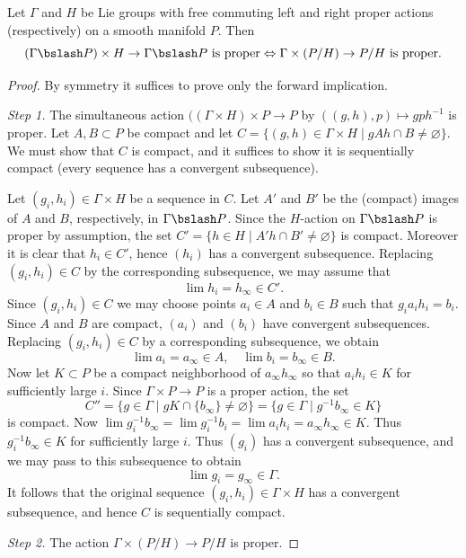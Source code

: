\begin{lem}\label{lem 3.12 Sharpe}
    Let $\Gamma$ and $H$ be Lie groups with free commuting left and right proper actions (respectively) on a smooth manifold $P$. Then 
    \[(\Gamma\bslash P)\times H\to \Gamma\bslash P\text{ is proper}\Leftrightarrow \Gamma\times(P\slash H)\to P\slash H\text{ is proper}.\]
\end{lem}
\begin{proof}
    By symmetry it suffices to prove only the forward implication. 
    
    \emph{Step 1.} The simultaneous action $((\Gamma\times H)\times P\to P$ by $((g,h),p)\mapsto gph^{-1}$ is proper. Let $A,B\subset P$ be compact and let $C=\{(g,h)\in \Gamma\times H\mid gAh\cap B\neq \varnothing\}$. We must show that $C$ is compact, and it suffices to show it is sequentially compact (every sequence has a convergent subsequence).

    Let $(g_i,h_i)\in\Gamma\times H$ be a sequence in $C$. Let $A'$ and $B'$ be the (compact) images of $A$ and $B$, respectively, in $\Gamma\bslash P$. Since the $H$-action on $\Gamma\bslash P$ is proper by assumption, the set $C'=\{h\in H\mid A'h\cap B'\neq \varnothing\}$ is compact. Moreover it is clear that $h_i\in C'$, hence $(h_i)$ has a convergent subsequence. Replacing $(g_i,h_i)\in C$ by the corresponding subsequence, we may assume that 
    \[\lim h_i=h_\infty\in C'.\]
    Since $(g_i,h_i)\in C$ we may choose points $a_i\in A$ and $b_i\in B$ such that $g_ia_ih_i=b_i$. Since $A$ and $B$ are compact, $(a_i)$ and $(b_i)$ have convergent subsequences. Replacing $(g_i,h_i)\in C$ by a corresponding subsequence, we obtain
    \[\lim a_i=a_\infty\in A,\quad \lim b_i=b_\infty\in B.\]
    Now let $K\subset P$ be a compact neighborhood of $a_\infty h_\infty$ so that $a_ih_i\in K$ for sufficiently large $i$. Since $\Gamma\times P\to P$ is a proper action, the set
    \[C''=\{g\in\Gamma\mid gK\cap \{b_\infty\}\neq\varnothing \}=\{g\in\Gamma\mid g^{-1}b_\infty\in K\}\]
    is compact. Now $\lim g_i^{-1}b_\infty=\lim g_i^{-1} b_i=\lim a_i h_i=a_\infty h_\infty\in K$. Thus $g_i^{-1}b_\infty\in K$ for sufficiently large $i$. Thus $(g_i)$ has a convergent subsequence, and we may pass to this subsequence to obtain 
    \[\lim g_i=g_\infty \in\Gamma.\]
    It follows that the original sequence $(g_i,h_i)\in\Gamma\times H$ has a convergent subsequence, and hence $C$ is sequentially compact.

    \emph{Step 2.} The action $\Gamma\times (P\slash H)\to P\slash H$ is proper.


\end{proof}
